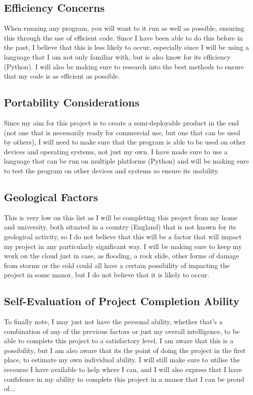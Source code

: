 \documentclass{article}
\begin{document}
\subsection{Efficiency Concerns}
When running any program, you will want to it run as well as possible, ensuring this through the use of efficient code. Since I have been able to do this before in the past, I believe that this is less likely to occur, especially since I will be using a language that I am not only familiar with, but is also know for its efficiency (Python). I will also be making sure to research into the best methods to ensure that my code is as efficient as possible.

\subsection{Portability Considerations}
Since my aim for this project is to create a semi-deployable product in the end (not one that is necessarily ready for commercial use, but one that can be used by others), I will need to make sure that the program is able to be used on other devices and operating systems, not just my own. I have made sure to use a language that can be run on multiple platforms (Python) and will be making sure to test the program on other devices and systems so ensure its usability.

\subsection{Geological Factors}
This is very low on this list as I will be completing this project from my home and university, both situated in a country (England) that is not known for its geological activity, so I do not believe that this will be a factor that will impact my project in any particularly significant way. I will be making sure to keep my work on the cloud just in case, as flooding, a rock slide, other forms of damage from storms or the cold could all have a certain possibility of impacting the project in some manor, but I do not believe that it is likely to occur.

\subsection{Self-Evaluation of Project Completion Ability}
To finally note, I may just not have the personal ability, whether that's a combination of any of the previous factors or just my overall intelligence, to be able to complete this project to a satisfactory level. I am aware that this is a possibility, but I am also aware that its the point of doing the project in the first place, to estimate my own individual ability. I will still make sure to utilise the recourse I have available to help where I can, and I will also express that I have confidence in my ability to complete this project in a manor that I can be proud of...



\end{document}
